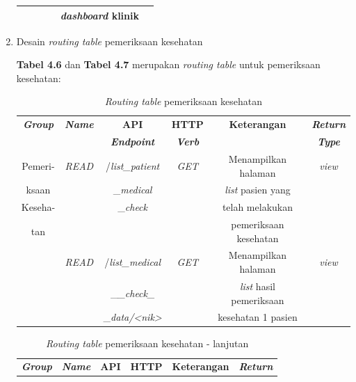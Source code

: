 \begin{enumerate}
\begin{table}[H]
\begin{tabular}{|c|c|c|c|c|c|}
			& 
			&
			&
			&
			\emph{dashboard} klinik &
			\\
			\hline
			
		\end{tabular}
	\end{table}
	
	\item Desain \emph{routing table} pemeriksaan kesehatan
	
	\textbf{Tabel 4.6} dan \textbf{Tabel 4.7} merupakan \emph{routing table} untuk pemeriksaan kesehatan:
	
	\begin{table}[H]
		\centering
		\caption{\emph{Routing table} pemeriksaan kesehatan}
		\label{tabel_input}
		\begin{tabular}{|c|c|c|c|c|c|}
			\hline
			\textbf{\emph{Group}} & \textbf{\emph{Name}} & \textbf{API} & \textbf{HTTP} & \textbf{Keterangan} & \textbf{\emph{Return}} \\
			
			& & \textbf{\emph{Endpoint}} & \textbf{\emph{Verb}} & & \textbf{\emph{Type}} \\
			\hline
			
			Pemeri-& 
			\emph{READ} &
			/\emph{list\_patient} &
			\emph{GET} &
			Menampilkan halaman &
			\emph{view}\\
			
			ksaan& 
			&
			\_\emph{medical}&
			&
			\emph{list} pasien yang  &
			\\
			
			Keseha-& 
			&
			\_\emph{check}&
			&
			telah melakukan &
			\\
			
			tan& 
			&
			&
			&
			pemeriksaan kesehatan &
			\\
			\hline
			
			& 
			\emph{READ} &
			/\emph{list\_medical} &
			\emph{GET} &
			Menampilkan halaman &
			\emph{view}\\
			
			& 
			&
			\_\emph{\_check\_}&
			&
			\emph{list} hasil pemeriksaan &
			\\
			
			& 
			&
			\_\emph{data/<nik>}&
			&
			kesehatan 1 pasien &
			\\
			\hline				
			
		\end{tabular}
	\end{table}
	
	\begin{table}[H]
		\centering
		\caption{\emph{Routing table} pemeriksaan kesehatan - lanjutan}
		\label{tabel_input}
		\begin{tabular}{|c|c|c|c|c|c|}
			\hline
			\textbf{\emph{Group}} & \textbf{\emph{Name}} & \textbf{API} & \textbf{HTTP} & \textbf{Keterangan} & \textbf{\emph{Return}} \\
			

\end{tabular}
\end{table}
\end{enumerate}
